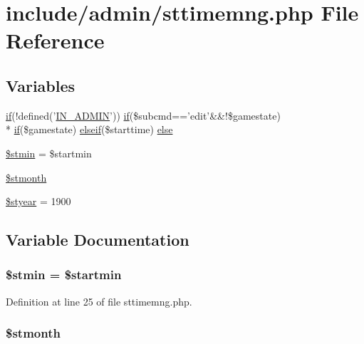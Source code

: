 \hypertarget{sttimemng_8php}{\section{include/admin/sttimemng.php File Reference}
\label{sttimemng_8php}
}
\subsection*{Variables}
\begin{DoxyCompactItemize}
\item 
\hyperlink{login__old_8php_a4ac1118c2e44c513a674bc1793ba6c90}{if}(!defined('\hyperlink{admin_8php_ad49472b0cdee543164375bf133a537f1}{I\+N\+\_\+\+A\+D\+M\+I\+N}')) \hyperlink{login__old_8php_a4ac1118c2e44c513a674bc1793ba6c90}{if}(\$subcmd=='edit'\&\&!\$gamestate) \\*
\hyperlink{login__old_8php_a4ac1118c2e44c513a674bc1793ba6c90}{if}(\$gamestate) \hyperlink{urlist_8php_a77f52b43f81ed05a41b68c2161789055}{elseif}(\$starttime) \hyperlink{sttimemng_8php_a5c2bdee9de438407c0bb5438c59f288a}{else}
\item 
\hyperlink{sttimemng_8php_a673bc1547456f6d21e386b6d3add1b91}{\$stmin} = \$startmin
\item 
\hyperlink{sttimemng_8php_a006358beabddbdb9061eb2079213a082}{\$stmonth}
\item 
\hyperlink{sttimemng_8php_a9cfaedc526b9ac44dbc3a05ef88916ed}{\$styear} = 1900
\end{DoxyCompactItemize}


\subsection{Variable Documentation}
\hypertarget{sttimemng_8php_a673bc1547456f6d21e386b6d3add1b91}{
\subsubsection[{\$stmin}]{\setlength{\rightskip}{0pt plus 5cm}\$stmin = \$startmin}}\label{sttimemng_8php_a673bc1547456f6d21e386b6d3add1b91}


Definition at line 25 of file sttimemng.\+php.

\hypertarget{sttimemng_8php_a006358beabddbdb9061eb2079213a082}{
\subsubsection[{\$stmonth}]{\setlength{\rightskip}{0pt plus 5cm}\$stmonth}}\label{sttimemng_8php_a006358beabddbdb9061eb2079213a082}


